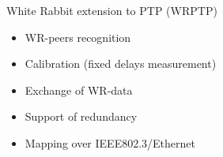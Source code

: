 \documentclass[compress,red]{beamer}
\begin{document}
% 
% 
\begin{frame}{White Rabbit extension to PTP (WRPTP)}

  \begin{itemize}
    \item WR-peers recognition
    \item Calibration (fixed delays measurement)
    \item Exchange of WR-data
    \item Support of redundancy
    \item Mapping over IEEE802.3/Ethernet
  \end{itemize}

\end{frame}
\end{document}
